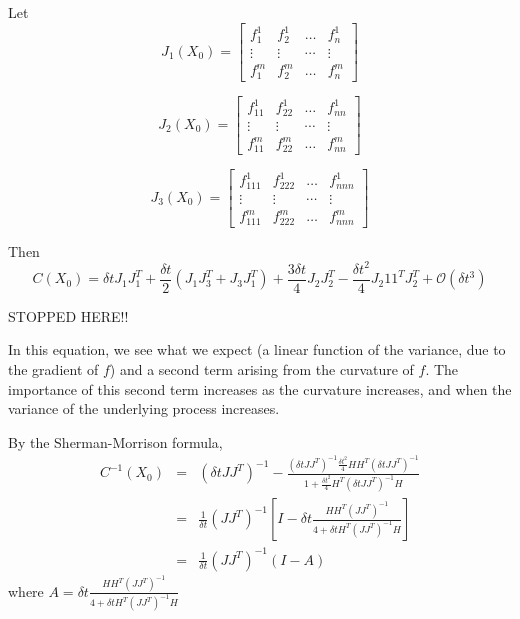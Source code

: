 \documentclass[12pt]{article}
\begin{document}
Let 
\begin{equation}
J_1(X_0) = \begin{bmatrix}
f_1^1 & f_2^1 & \dots & f_n^1 \\
\vdots & \vdots & \cdots & \vdots \\
f_1^m & f_2^m & \dots & f_n^m
\end{bmatrix}
\end{equation}

\begin{equation}
J_2(X_0) = \begin{bmatrix}
f_{11}^1 & f_{22}^1 & \dots & f_{nn}^1 \\
\vdots & \vdots & \cdots & \vdots \\
f_{11}^m & f_{22}^m & \dots & f_{nn}^m
\end{bmatrix}
\end{equation}

\begin{equation}
J_3(X_0) = \begin{bmatrix}
f_{111}^1 & f_{222}^1 & \dots & f_{nnn}^1 \\
\vdots & \vdots & \cdots & \vdots \\
f_{111}^m & f_{222}^m & \dots & f_{nnn}^m
\end{bmatrix}
\end{equation}

Then
\begin{equation}
C(X_0) = \delta t J_1 J_1^T 
+ \frac{\delta t}{2} \left( J_1 J_3^T + J_3 J_1^T \right) 
+ \frac{3 \delta t}{4} J_2 J_2^T 
-\frac{\delta t^2}{4} J_2 1 1^T J_2^T
+ \mathcal{O} (\delta t^3)
\end{equation}
 
 STOPPED HERE!!
 
In this equation, we see what we expect (a linear function of the variance, due to the gradient of $f$) and a second term arising from the curvature of $f$.
%
The importance of this second term increases as the curvature increases, and when the variance of the underlying process increases. 

 By the Sherman-Morrison formula,
 \begin{eqnarray}
 C^{-1}(X_0) &=&  
 \left(\delta t J J^T \right)^{-1} - \frac{ \left(\delta t J J^T \right)^{-1} \frac{\delta t^2}{4} H H^T \left(\delta t J J^T \right)^{-1} }{1+ \frac{\delta t^2}{4} H^T \left(\delta t J J^T \right)^{-1} H} \\
 &=& \frac{1}{\delta t} \left(J J^T \right)^{-1} \left[ I - \delta t \frac{ H H^T \left(J J^T \right)^{-1} }{4+ \delta t H^T \left( J J^T \right)^{-1} H } \right]  \\
 &=& \frac{1}{\delta t} \left(J J^T \right)^{-1} \left( I - A  \right)
 \end{eqnarray}
where $A = \delta t \frac{ H H^T \left(J J^T \right)^{-1} }{4+ \delta t H^T \left( J J^T \right)^{-1} H }$
\end{document}
